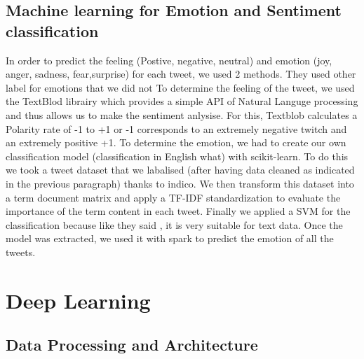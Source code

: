 \documentclass{acmtog} %
\begin{document}
\subsection{Machine learning for Emotion and Sentiment classification}
\label{subsub:ml}

In order to predict the feeling (Postive, negative, neutral) and emotion (joy, anger, sadness, fear,surprise) for each tweet, we used 2 methods. They used other label for emotions that we did not 
To determine the feeling of the tweet, we used the TextBlod librairy which provides a simple API of Natural Languge processing and thus allows us to make the sentiment anlysise. For this, Textblob calculates a Polarity rate of -1 to +1 or -1 corresponds to an extremely negative twitch and an extremely positive +1.
To determine the emotion, we had to create our own classification model (classification in English what) with scikit-learn.
To do this we took a tweet dataset that we labalised (after having data cleaned as indicated in the previous paragraph) thanks to indico.
We then transform this dataset into a term document matrix and apply a TF-IDF standardization to evaluate the importance of the term content in each tweet.
Finally we applied a SVM for the classification because like they said \cite{Medhat14}, it is very suitable for text data.
Once the model was extracted, we used it with spark to predict the emotion of all the tweets.

\section{Deep Learning}
\label{sec:dp}

\subsection{Data Processing and Architecture}
\label{subsub:dl}
\end{document}
